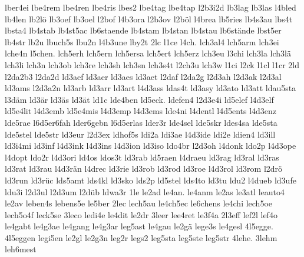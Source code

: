 {    lber4ei
    lbe4rem
    lbe4ren
    lbe4ris
    lbes2
    lbe4tag
    lbe4tap
    l2b3i2d
    lb3lag
    lb3las
    l4bled
    lb4len
    lb2lö
    lb3oef
    lb3oel
    l2bof
    l4b3ora
    l2b3ov
    l2böl
    l4brea
    lb5ries
    lb4s3au
    lbs4t
    lbsta4
    lb4stab
    lb4st5ac
    lb6staende
    lb4stam
    lb4stan
    lb4stau
    lb6stände
    lbst5er
    lb4str
    lb2u
    lbuch5s
    lbu2n
    l4b3une
    lby2t
    2lc
    l1ce
    l4ch.
    lch3al4
    lch5arm
    lch3ei
    lche4n
    l5chen.
    lch5erh
    lch5ern
    lch5ersa
    lch5ert
    lch5erz
    lch3eu
    l3chi
    lch3la
    lch3lä
    lch3li
    lch3n
    lch3ob
    lch3re
    lch3sh
    lch3sn
    lch3s4t
    l2ch3u
    lch3w
    l1ci
    l2ck
    l1cl
    l1cr
    2ld
    l2da2b3
    l2da2d
    ld3aef
    ld3aer
    ld3aes
    ld3aet
    l2daf
    l2da2g
    l2d3ah
    l2d3ak
    l2d3al
    ld3ams
    l2d3a2n
    ld3arb
    ld3arr
    ld3art
    l4d3ass
    ldas4t
    ld3asy
    ld3ato
    ld3att
    ldau5sta
    l3däm
    ld3är
    ld3äs
    ld3ät
    ld1c
    lde4ben
    ld5eck.
    ldefen4
    l2d3e4i
    ld5elef
    l4d3elf
    ld5e4lit
    l4d3emb
    ld5e4mis
    l4d3emp
    l4d3ems
    lde4ni
    l4dentl
    l4d5ents
    l4d3enz
    lde5rae
    l6d5er6fah
    lder6gebn
    l6d5erlas
    lder3r
    lde4sel
    lde5skr
    ldes4sa
    lde5sta
    lde5stel
    lde5str
    ld3eur
    l2d3ex
    ldhof5s
    ldi2a
    ldi3ae
    l4d3ide
    ldi2e
    ldien4
    ld3ill
    ld3i4mi
    ld3inf
    l4d3ink
    l4d3ins
    l4d3ion
    ld3iso
    ldo4br
    l2d3oh
    l4donk
    ldo2p
    l4d3ope
    l4dopt
    ldo2r
    l4d3ori
    ld4os
    ldos3t
    ld3rab
    ld5raen
    l4draeu
    ld3rag
    ld3ral
    ld3ras
    ld3rat
    ld3rau
    l4d3rän
    l4drec
    ld3rie
    ld3rob
    ld3rod
    ld3roe
    l4d3rol
    ld3rom
    l2drö
    ld3run
    ld3rüc
    lds5amt
    lds4kl
    ld3sko
    lds2p
    ld5stel
    lds4to
    ld3tu
    ldu2
    l4dueb
    ld3ufe
    ldu3i
    l2d3ul
    l2d3um
    l2düb
    ldwa3r
    1le
    le2ad
    le4an.
    le4anm
    le2as
    le3atl
    leauto4
    le2av
    leben4s
    lebens5e
    le5ber
    2lec
    lech5au
    le4ch5ec
    le6chens
    le4chi
    lech5oe
    lech5o4f
    leck5se
    3leco
    ledi4e
    le4dit
    le2dr
    3leer
    lee4ret
    le3f4a
    2l3eff
    lef2l
    lef4o
    le4gabt
    le4g3ae
    le4gang
    le4g3ar
    leg5ast
    le4gau
    le2gä
    lege3s
    le4gesl
    4l5egge.
    4l5eggen
    legi5en
    le2gl
    le2g3n
    leg2r
    legs2
    leg5sta
    leg5ste
    leg5str
    4lehe.
    3lehm
    leh6mest
}
